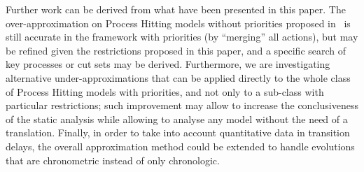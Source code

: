 Further work can be derived from what have been presented in this paper.
The over-approximation on Process Hitting models without priorities proposed in~\cite{PMR12-MSCS}
is still accurate in the framework with priorities (by “merging” all actions),
but may be refined given the restrictions proposed in this paper,
and a specific search of key processes or cut sets \cite{PAK13-CAV} may be derived.
Furthermore, we are investigating alternative under-approximations that can be
applied directly to the whole class of Process Hitting models with priorities,
and not only to a sub-class with particular restrictions;
such improvement may allow to increase the conclusiveness of the static analysis
while allowing to analyse any model without the need of a translation.
Finally, in order to take into account quantitative data in transition delays, the overall approximation method could be extended to handle evolutions that are chronometric instead of only chronologic.
